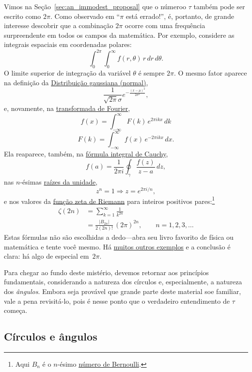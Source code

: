 {Vimos na Seção~\ref{sec:an_immodest_proposal} que o númeroo $\tau$ também pode ser escrito como $2\pi$. Como observado em ``$\pi$ está errado!'', é, portanto, de grande interesse descobrir que a combinação $2\pi$ ocorre com uma frequência surpreendente em todos os campos da matemática. Por exemplo, considere as integrais espaciais em coordenadas polares:
\[
  \int_0^{2\pi}\int_0^\infty f(r, \theta)\, r\, dr\, d\theta.
\]
O limite superior de integração da variável $\theta$ é sempre $2\pi$. O mesmo fator aparece na definição da \href{https://pt.wikipedia.org/wiki/Distribui%C3%A7%C3%A3o_normal}{Distribuição gaussiana (normal)},
\[
  \frac{1}{\sqrt{2\pi}\sigma}e^{-\frac{(x-\mu)^2}{2\sigma^2}},
\]
e, novamente, na \href{https://mathworld.wolfram.com/FourierTransform.html}{transformada de Fourier},
\[
  f(x) = \int_{-\infty}^\infty F(k)\, e^{2\pi ikx}\,dk
\]
\[
    F(k) = \int_{-\infty}^\infty f(x)\, e^{-2\pi ikx}\,dx.
\]
Ela reaparece, também, na \href{https://pt.wikipedia.org/wiki/F%C3%B3rmula_integral_de_Cauchy}{fórmula integral de Cauchy},
\[
  f(a) = \frac{1}{2\pi i}\oint_\gamma\frac{f(z)}{z-a}\,dz,
\]
nas $n$-ésimas \href{https://pt.wikipedia.org/wiki/Raiz_da_unidade}{raízes da unidade},
\[
  z^n = 1 \Rightarrow z = e^{2\pi i/n},
\]
e nos valores da \href{https://pt.wikipedia.org/wiki/Fun%C3%A7%C3%A3o_zeta_de_Riemann}{função zeta de Riemann} para inteiros positivos pares:\footnote{Aqui $B_n$ é o $n$-ésimo \href{https://pt.wikipedia.org/wiki/N%C3%BAmeros_de_Bernoulli}{número de Bernoulli}.}
\[
\begin{split}
  \zeta(2n) & = \sum_{k=1}^\infty \frac{1}{k^{2n}} \\
            & = \frac{|B_{2n}|}{2(2n)!}\,(2\pi)^{2n},\qquad n = 1, 2, 3, \ldots
\end{split}
\]
Estas fórmulas não são escolhidas a dedo---abra seu livro favorito de física ou matemática e tente você mesmo. Há \href{http://www.harremoes.dk/Peter/Undervis/Turnpage/Turnpage1.html}{muitos outros exemplos} e a conclusão é clara: há algo de especial em~$2\pi$.

Para chegar ao fundo deste mistério, devemos retornar aos princípios fundamentais, considerando a natureza dos círculos e, especialmente, a natureza dos \emph{ângulos}. Embora seja provável que grande parte deste material soe familiar, vale a pena revisitá-lo, pois é nesse ponto que o verdadeiro entendimento de $\tau$ começa.

  \subsection{Círculos e ângulos} %
  \label{sec:circles_and_angles}

}
